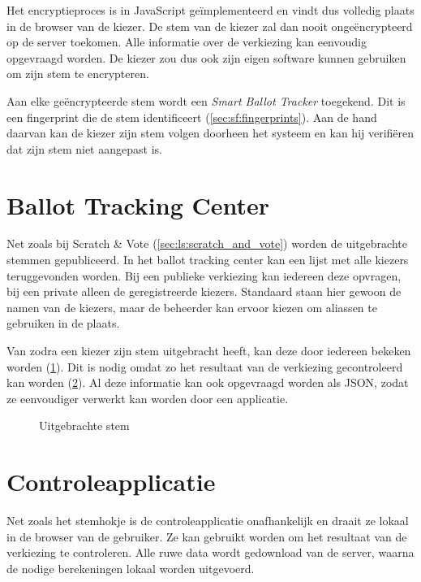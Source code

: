 \npar Het encryptieproces is in JavaScript ge\"implementeerd en vindt dus volledig plaats in de browser van de kiezer. De stem van de kiezer zal dan nooit onge\"encrypteerd op de server toekomen. Alle informatie over de verkiezing kan eenvoudig opgevraagd worden. De kiezer zou dus ook zijn eigen software kunnen gebruiken om zijn stem te encrypteren.

\npar Aan elke ge\"encrypteerde stem wordt een \textit{Smart Ballot Tracker} toegekend. Dit is een fingerprint die de stem identificeert (\ref{sec:sf:fingerprints}). Aan de hand daarvan kan de kiezer zijn stem volgen doorheen het systeem en kan hij verifi\"eren dat zijn stem niet aangepast is.

\section{Ballot Tracking Center}
\label{sec:helios:ballot_tracking_center}

Net zoals bij Scratch \& Vote (\ref{sec:ls:scratch_and_vote}) worden de uitgebrachte stemmen gepubliceerd. In het ballot tracking center kan een lijst met alle kiezers teruggevonden worden. Bij een publieke verkiezing kan iedereen deze opvragen, bij een private alleen de geregistreerde kiezers. Standaard staan hier gewoon de namen van de kiezers, maar de beheerder kan ervoor kiezen om aliassen te gebruiken in de plaats.

\npar Van zodra een kiezer zijn stem uitgebracht heeft, kan deze door iedereen bekeken worden (\ref{fig:helios:cast_vote}). Dit is nodig omdat zo het resultaat van de verkiezing gecontroleerd kan worden (\ref{sec:helios:controleapplicatie}). Al deze informatie kan ook opgevraagd worden als JSON, zodat ze eenvoudiger verwerkt kan worden door een applicatie.

\begin{figure}
  \caption{Uitgebrachte stem}
  \label{fig:helios:cast_vote}
\end{figure}

\section{Controleapplicatie}
\label{sec:helios:controleapplicatie}

Net zoals het stemhokje is de controleapplicatie onafhankelijk en draait ze lokaal in de browser van de gebruiker. Ze kan gebruikt worden om het resultaat van de verkiezing te controleren. Alle ruwe data wordt gedownload van de server, waarna de nodige berekeningen lokaal worden uitgevoerd.
